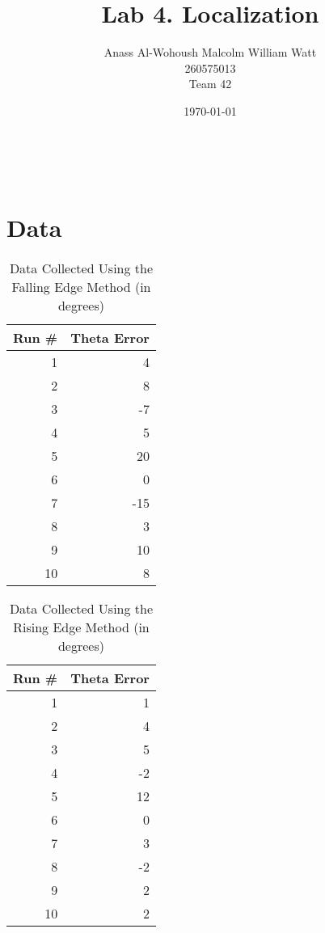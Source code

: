 \documentclass[letterpaper,12pt]{article}
\begin{document}
\title{Lab 4. Localization}
\date{\today}
\author{Anass Al-Wohoush \quad \quad Malcolm William Watt \\ 260575013 \quad \quad \quad \quad \quad \quad {}\\ Team 42}
\maketitle
\mbox{}\\

\section{Data}{
\begin{table}[h]
\centering
    \begin{tabular}{|r|r|}
    \hline
    Run \# & Theta Error \\ \hline
    1      & 4           \\ \hline
    2      & 8           \\ \hline
    3      & -7          \\ \hline
    4      & 5           \\ \hline
    5      & 20          \\ \hline
    6      & 0           \\ \hline
    7      & -15         \\ \hline
    8      & 3           \\ \hline
    9      & 10          \\ \hline
    10     & 8           \\ \hline
    \end{tabular}
    \caption {Data Collected Using the Falling Edge Method (in degrees)}
\end{table}
\clearpage
\begin{table}[h]
\centering
    \begin{tabular}{|r|r|}
    \hline
    Run \# & Theta Error \\ \hline
    1      & 1           \\ \hline
    2      & 4           \\ \hline
    3      & 5           \\ \hline
    4      & -2          \\ \hline
    5      & 12          \\ \hline
    6      & 0           \\ \hline
    7      & 3           \\ \hline
    8      & -2          \\ \hline
    9      & 2           \\ \hline
    10     & 2           \\ \hline
    \end{tabular}
    \caption {Data Collected Using the Rising Edge Method (in degrees)}
\end{table}
}
\end{document}
